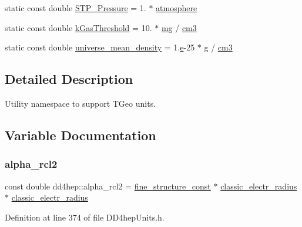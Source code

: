 \begin{DoxyCompactItemize}
\item 
static const double \hyperlink{namespacedd4hep_a9ace4de2d3dba6a0e6f3d0ab29a498aa}{S\+T\+P\+\_\+\+Pressure} = 1. $\ast$ \hyperlink{namespacedd4hep_a3907dd93dc8fc5b2f3b0fb9b92e46c5b}{atmosphere}
\item 
static const double \hyperlink{namespacedd4hep_ad7b0ac954bae8a93a0162f9f08fd9766}{k\+Gas\+Threshold} = 10. $\ast$ \hyperlink{namespacedd4hep_a16e0deb2b676a8d02ab7cf5cf7a8237b}{mg} / \hyperlink{namespacedd4hep_a6464c11bda4aa7d6c4d42f70dbcaf803}{cm3}
\item 
static const double \hyperlink{namespacedd4hep_a139a30c8403dfa4a6294daf563d735dd}{universe\+\_\+mean\+\_\+density} = 1.\hyperlink{_volumes_8cpp_a8a9a1f93e9b09afccaec215310e64142}{e}-\/25 $\ast$ \hyperlink{namespacedd4hep_a70d02ec06109b52625ae28861ff25d56}{g} / \hyperlink{namespacedd4hep_a6464c11bda4aa7d6c4d42f70dbcaf803}{cm3}
\end{DoxyCompactItemize}


\subsection{Detailed Description}
Utility namespace to support T\+Geo units. 

\subsection{Variable Documentation}
\hypertarget{namespacedd4hep_affee5485f0351ee3618be1021c703e23}{}\label{namespacedd4hep_affee5485f0351ee3618be1021c703e23} 
\subsubsection{\texorpdfstring{alpha\+\_\+rcl2}{alpha\_rcl2}}
{\footnotesize\ttfamily const double dd4hep\+::alpha\+\_\+rcl2 = \hyperlink{namespacedd4hep_aa979b30c6c7f9ba61132327d4584bfde}{fine\+\_\+structure\+\_\+const} $\ast$ \hyperlink{namespacedd4hep_ab829ac901c489f46802352c5e2b3c165}{classic\+\_\+electr\+\_\+radius} $\ast$ \hyperlink{namespacedd4hep_ab829ac901c489f46802352c5e2b3c165}{classic\+\_\+electr\+\_\+radius}\hspace{0.3cm}{\ttfamily [static]}}



Definition at line 374 of file D\+D4hep\+Units.\+h.

\hypertarget{namespacedd4hep_a1342ab2280c2fed87fe4beaebae8cf52}{}\label{namespacedd4hep_a1342ab2280c2fed87fe4beaebae8cf52} 
